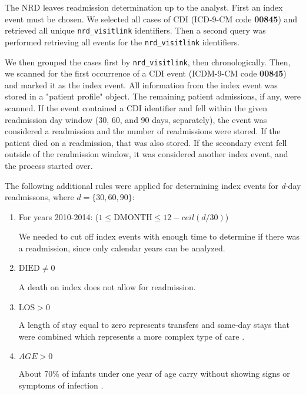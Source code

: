 The NRD leaves readmission determination up to the analyst. First an index event must be chosen. 
We selected all cases of CDI (ICD-9-CM code \textbf{00845}) and retrieved all unique \texttt{nrd\_visitlink}
identifiers. Then a second query was performed retrieving all events for the \texttt{nrd\_visitlink} identifiers.

We then grouped the cases first by \texttt{nrd\_visitlink}, then chronologically. Then, we scanned for the first
occurrence of a CDI event (ICDM-9-CM code \textbf{00845}) and marked it as the index event. All information from
the index event was stored in a "patient profile" object. The remaining patient admissions, if any, were scanned.
If the event contained a CDI identifier and fell within the given readmission day window (30, 60, and 90 days, separately),
the event was considered a readmission and the number of readmissions were stored. If the patient died on a readmission,
that was also stored. If the secondary event fell outside of the readmission window, it was considered another index event, 
and the process started over.

The following additional rules were applied for determining index events for \textit{d}-day readmissons, where $d = \{30, 60, 90\}$:

\begin{enumerate}
    \item For years 2010-2014: ($1 \le \text{DMONTH} \le 12 - ceil(d/30)$)
    
    We needed to cut off index events with enough time to determine if there was a readmission, since only calendar years can be analyzed.
    
    \item $\text{DIED} \ne 0$
    
    A death on index does not allow for readmission.
    
    \item $\text{LOS} > 0$
    
    A length of stay equal to zero represents transfers and same-day stays that were combined which represents a more complex type of care \cite{NRDIntroduction2013}.
    
    \item $AGE > 0$
  
    About 70\% of infants under one year of age carry \cdiff without showing signs or symptoms of infection \cite{Lamont2017}. 
    
\end{enumerate}



